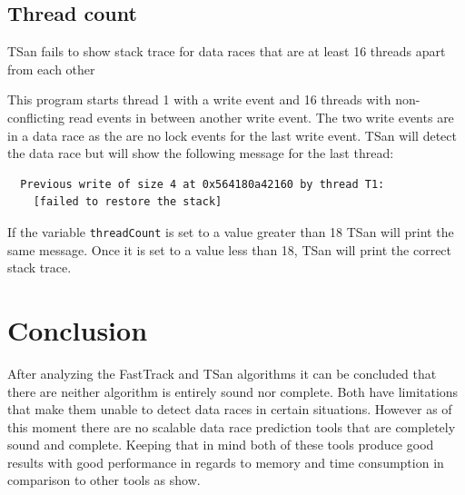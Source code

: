 \documentclass[12pt]{article}
\begin{document}
	\subsection{Thread count}
	TSan fails to show stack trace for data races that are at least 16 threads apart from each other
	
	This program starts thread 1 with a write event and 16 threads with non-conflicting read events in between another write event. The two write events are in a data race as the are no lock events for the last write event. TSan will detect the data race but will show the following message for the last thread:
	\begin{lstlisting}
  Previous write of size 4 at 0x564180a42160 by thread T1:
    [failed to restore the stack]
	\end{lstlisting}
	If the variable \texttt{threadCount} is set to a value greater than 18 TSan will print the same message. Once it is set to a value less than 18, TSan will print the correct stack trace.
	\section{Conclusion}
	After analyzing the FastTrack and TSan algorithms it can be concluded that there are neither algorithm is entirely sound nor complete. Both have limitations that make them unable to detect data races in certain situations. However as of this moment there are no scalable data race prediction tools that are completely sound and complete. Keeping that in mind both of these tools produce good results with good performance in regards to memory and time consumption in comparison to other tools as \cite{flanagan}\cite{wilcox} show.
	\newpage                                          
	\printbibliography[heading= bibintoc, title={List of Literature}]
	\newpage
	{\hypersetup{linkcolor=black}
		\listoffigures
		\newpage
		\listoftables
		\newpage
		\lstlistoflistings
	}
\end{document}
